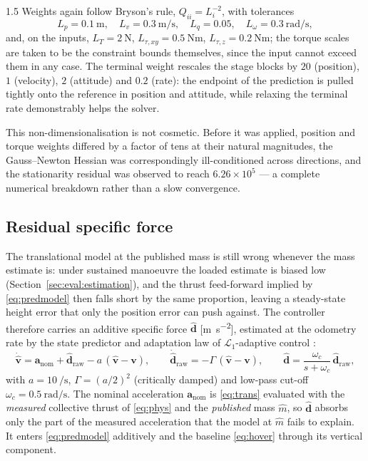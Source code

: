 \begin{spacing}{1.5}
Weights again follow Bryson's rule, $Q_{ii}=L_i^{-2}$, with tolerances
\begin{equation}
L_p=\SI{0.1}{\meter},\quad
L_v=\SI{0.3}{\meter\per\second},\quad
L_q=0.05,\quad
L_\omega=\SI{0.3}{\radian\per\second},
\label{eq:Lstate}
\end{equation}
and, on the inputs,
$L_T=\SI{2}{\newton}$, $L_{\tau,xy}=\SI{0.5}{\newton\meter}$,
$L_{\tau,z}=\SI{0.2}{\newton\meter}$; the torque scales are taken to be the
constraint bounds themselves, since the input cannot exceed them in any case. The
terminal weight rescales the stage blocks by $20$ (position), $1$ (velocity), $2$
(attitude) and $0.2$ (rate): the endpoint of the prediction is pulled tightly
onto the reference in position and attitude, while relaxing the terminal rate
demonstrably helps the solver.

This non-dimensionalisation is not cosmetic. Before it was applied, position and
torque weights differed by a factor of tens at their natural magnitudes, the
Gauss--Newton Hessian was correspondingly ill-conditioned across directions, and
the stationarity residual was observed to reach $6.26\times10^{5}$ --- a complete
numerical breakdown rather than a slow convergence.

\subsection{Residual specific force}\label{sec:model:residual}

The translational model at the published mass is still wrong whenever the mass
estimate is: under sustained manoeuvre the loaded estimate is biased low
(Section~\ref{sec:eval:estimation}), and the thrust feed-forward implied by
\eqref{eq:predmodel} then falls short by the same proportion, leaving a
steady-state height error that only the position error can push against. The
controller therefore carries an additive specific force $\hat{\bm d}$
[\si{\meter\per\second\squared}], estimated at the odometry rate by the
state predictor and adaptation law of $\mathcal{L}_1$-adaptive control
\cite{hanover2021}:
\begin{equation}
\dot{\hat{\bm v}} = \bm a_{\mathrm{nom}} + \hat{\bm d}_{\mathrm{raw}}
 - a\,(\hat{\bm v}-\bm v),\qquad
\dot{\hat{\bm d}}_{\mathrm{raw}} = -\Gamma\,(\hat{\bm v}-\bm v),\qquad
\hat{\bm d} = \frac{\omega_c}{s+\omega_c}\,\hat{\bm d}_{\mathrm{raw}},
\label{eq:l1resid}
\end{equation}
with $a=\SI{10}{\per\second}$, $\Gamma=(a/2)^2$ (critically damped) and
low-pass cut-off $\omega_c=\SI{0.5}{\radian\per\second}$. The nominal
acceleration $\bm a_{\mathrm{nom}}$ is \eqref{eq:trans} evaluated with the
\emph{measured} collective thrust of \eqref{eq:phys} and the \emph{published}
mass $\hat m$, so $\hat{\bm d}$ absorbs only the part of the measured
acceleration that the model at $\hat m$ fails to explain. It enters
\eqref{eq:predmodel} additively and the baseline \eqref{eq:hover} through its
vertical component.


\end{spacing}
